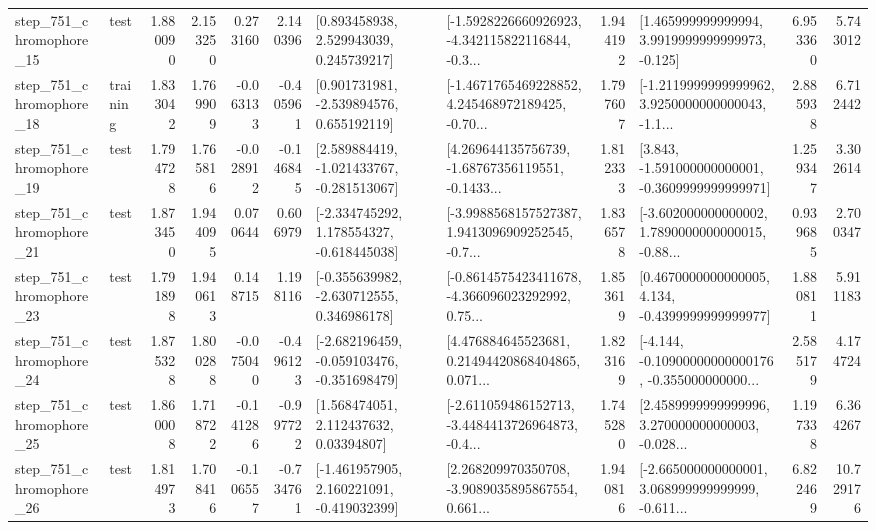 \begin{tabular}{llrrrrllrlrr}
  step\_751\_chromophore\_15 &      test &      1.880090 &    2.153250 &      0.273160 &  2.140396 &     [0.893458938, 2.529943039, 0.245739217] &  [-1.5928226660926923, -4.342115822116844, -0.3... &       1.944192 &    [1.465999999999994, 3.9919999999999973, -0.125] &            6.953360 &          5.743012 \\
  step\_751\_chromophore\_18 &  training &      1.833042 &    1.769909 &     -0.063133 & -0.405961 &    [0.901731981, -2.539894576, 0.655192119] &  [-1.4671765469228852, 4.245468972189425, -0.70... &       1.797607 &  [-1.2119999999999962, 3.9250000000000043, -1.1... &            2.885938 &          6.712442 \\
  step\_751\_chromophore\_19 &      test &      1.794728 &    1.765816 &     -0.028912 & -0.146845 &   [2.589884419, -1.021433767, -0.281513067] &  [4.269644135756739, -1.68767356119551, -0.1433... &       1.812333 &   [3.843, -1.591000000000001, -0.3609999999999971] &            1.259347 &          3.302614 \\
  step\_751\_chromophore\_21 &      test &      1.873450 &    1.944095 &      0.070644 &  0.606979 &   [-2.334745292, 1.178554327, -0.618445038] &  [-3.9988568157527387, 1.9413096909252545, -0.7... &       1.836578 &  [-3.602000000000002, 1.7890000000000015, -0.88... &            0.939685 &          2.700347 \\
  step\_751\_chromophore\_23 &      test &      1.791898 &    1.940613 &      0.148715 &  1.198116 &   [-0.355639982, -2.630712555, 0.346986178] &  [-0.8614575423411678, -4.366096023292992, 0.75... &       1.853619 &   [0.4670000000000005, 4.134, -0.4399999999999977] &            1.880811 &          5.911183 \\
  step\_751\_chromophore\_24 &      test &      1.875328 &    1.800288 &     -0.075040 & -0.496123 &  [-2.682196459, -0.059103476, -0.351698479] &  [4.476884645523681, 0.21494420868404865, 0.071... &       1.823169 &  [-4.144, -0.10900000000000176, -0.355000000000... &            2.585179 &          4.174724 \\
  step\_751\_chromophore\_25 &      test &      1.860008 &    1.718722 &     -0.141286 & -0.997722 &      [1.568474051, 2.112437632, 0.03394807] &  [-2.611059486152713, -3.4484413726964873, -0.4... &       1.745280 &  [2.4589999999999996, 3.270000000000003, -0.028... &            1.197338 &          6.364267 \\
  step\_751\_chromophore\_26 &      test &      1.814973 &    1.708416 &     -0.106557 & -0.734761 &   [-1.461957905, 2.160221091, -0.419032399] &  [2.268209970350708, -3.9089035895867554, 0.661... &       1.940816 &  [-2.665000000000001, 3.068999999999999, -0.611... &            6.822469 &         10.729176 \\

\end{tabular}
